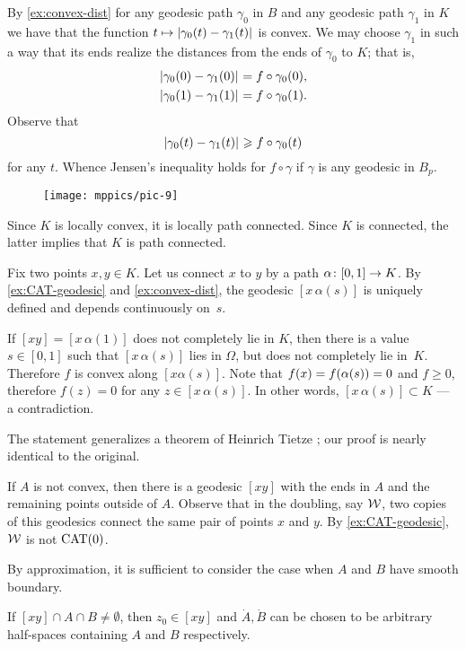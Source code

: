 By \ref{ex:convex-dist} for any geodesic path $\gamma_0$ in $B$ and any geodesic path $\gamma_1$ in $K$ we have that the function 
$t\mapsto\dist{\gamma_0(t)}{\gamma_1(t)}{}$ is convex.
We may choose $\gamma_1$ in such a way that its ends realize the distances from the ends of $\gamma_0$ to $K$;
that is,
\begin{align*}
\dist{\gamma_0(0)}{\gamma_1(0)}{}&=f\circ\gamma_0(0),
\\
\dist{\gamma_0(1)}{\gamma_1(1)}{}&=f\circ\gamma_0(1).
\end{align*}
Observe that 
\[\dist{\gamma_0(t)}{\gamma_1(t)}{}\ge f\circ\gamma_0(t)\]
for any $t$.
Whence Jensen's inequality holds for $f\circ\gamma$ if $\gamma$ is any geodesic in $B_p$.

\begin{wrapfigure}{o}{45 mm}
\vskip-4mm
\centering
\texttt{[image: mppics/pic-9]}
\end{wrapfigure}

Since $K$ is locally convex,
it is locally path connected.
Since $K$ is connected, the latter implies that $K$ is path connected.

Fix two points $x,y\in K$. 
Let us connect $x$ to $y$ by a path $\alpha\:[0,1]\z\to K$.
By \ref{ex:CAT-geodesic} and \ref{ex:convex-dist}, the geodesic $[x\,\alpha(s)]$ 
is uniquely defined and depends continuously on~$s$.

If $[xy]=[x\,\alpha(1)]$ does not completely lie in $K$, then 
there is a value $s\in [0,1]$ such that $[x\,\alpha(s)]$ 
lies in $\Omega$,
but does not completely lie in~$K$.
Therefore $f$ is convex 
along $[x\alpha(s)]$.
Note that $f(x)\z=f(\alpha(s))=0$ and $f\ge 0$, 
therefore $f(z)= 0$ for any $z\in [x\,\alpha(s)]$.
In other words, $[x\,\alpha(s)]\subset K$ --- a contradiction.

The statement generalizes a theorem of Heinrich Tietze \cite{tietze}; our proof is nearly identical to the original.

If $A$ is not convex, then there is a geodesic $[xy]$ with the ends in $A$ and the remaining points outside of $A$.
Observe that in the doubling, say $\mathcal{W}$, two copies of this geodesics connect the same pair of points $x$ and $y$.
By \ref{ex:CAT-geodesic}, $\mathcal{W}$ is not $\mathrm{CAT}(0)$.

By approximation, it is sufficient to consider the case when 
$A$ and $B$ have smooth boundary. 

If $[xy]\cap A\cap B\ne \emptyset$, then $z_0\in [xy]$ and $\dot A, \dot B$ can be chosen to be arbitrary half-spaces containing $A$ and $B$ respectively.  

